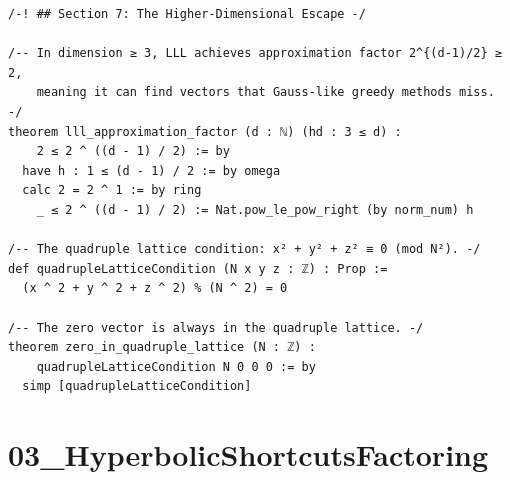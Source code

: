 \documentclass[11pt,openany]{book}
\theoremstyle{definition}
\theoremstyle{plain}
\theoremstyle{remark}
\begin{document}
\begin{lstlisting}[style=lean]
/-! ## Section 7: The Higher-Dimensional Escape -/

/-- In dimension ≥ 3, LLL achieves approximation factor 2^{(d-1)/2} ≥ 2,
    meaning it can find vectors that Gauss-like greedy methods miss. -/
theorem lll_approximation_factor (d : ℕ) (hd : 3 ≤ d) :
    2 ≤ 2 ^ ((d - 1) / 2) := by
  have h : 1 ≤ (d - 1) / 2 := by omega
  calc 2 = 2 ^ 1 := by ring
    _ ≤ 2 ^ ((d - 1) / 2) := Nat.pow_le_pow_right (by norm_num) h

/-- The quadruple lattice condition: x² + y² + z² ≡ 0 (mod N²). -/
def quadrupleLatticeCondition (N x y z : ℤ) : Prop :=
  (x ^ 2 + y ^ 2 + z ^ 2) % (N ^ 2) = 0

/-- The zero vector is always in the quadruple lattice. -/
theorem zero_in_quadruple_lattice (N : ℤ) :
    quadrupleLatticeCondition N 0 0 0 := by
  simp [quadrupleLatticeCondition]

\end{lstlisting}

\clearpage

\section*{03\_HyperbolicShortcutsFactoring}
\end{document}
